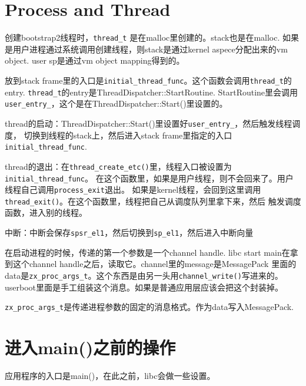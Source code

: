 \section{Process and Thread}

创建bootstrap2线程时，\verb|thread_t| 是在malloc里创建的。stack也是在malloc.
如果是用户进程通过系统调用创建线程，则stack是通过kernel aspece分配出来的vm object.
user sp是通过vm object mapping得到的。

放到stack frame里的入口是\verb|initial_thread_func|。这个函数会调用\verb|thread_t|的entry.
\verb|thread_t|的entry是ThreadDispatcher::StartRoutine. StartRoutine里会调用
\verb|user_entry_|，这个是在ThreadDispatcher::Start()里设置的。

thread的启动：ThreadDispatcher::Start()里设置好\verb|user_entry_|，然后触发线程调度，
切换到线程的stack上，然后进入stack frame里指定的入口\verb|initial_thread_func|.

thread的退出：在\verb|thread_create_etc()|里，线程入口被设置为\verb|initial_thread_func|。
在这个函数里，如果是用户线程，则不会回来了。用户线程自己调用\verb|process_exit|退出。
如果是kernel线程，会回到这里调用\verb|thread_exit()|。在这个函数里，线程把自己从调度队列里拿下来，然后
触发调度函数，进入别的线程。

中断：中断会保存\verb|spsr_el1|，然后切换到\verb|sp_el1|，然后进入中断向量


在启动进程的时候，传递的第一个参数是一个channel handle.
libc start main在拿到这个channel handle之后，读取它。channel里的message是MessagePack
里面的data是\verb|zx_proc_args_t|。这个东西是由另一头用\verb|channel_write()|写进来的。
userboot里面是手工组装这个消息。如果是普通应用层应该会把这个封装掉。

\verb|zx_proc_args_t|是传递进程参数的固定的消息格式。作为data写入MessagePack.

\section{进入main()之前的操作}

应用程序的入口是main()，在此之前，libc会做一些设置。


